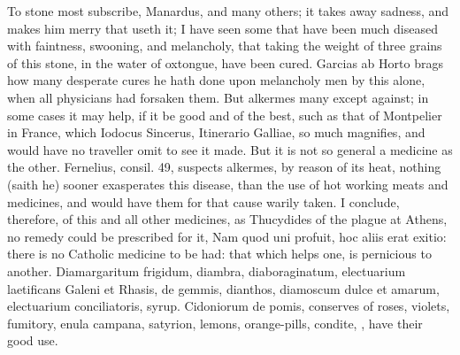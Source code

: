 To  stone most subscribe, Manardus, and many others; it
takes away sadness, and makes him merry that useth it; I have seen some
that have been much diseased with faintness, swooning, and melancholy,
that taking the weight of three grains of this stone, in the water of
oxtongue, have been cured. Garcias ab Horto brags how many desperate
cures he hath done upon melancholy men by this alone, when all
physicians had forsaken them. But alkermes many except against; in some
cases it may help, if it be good and of the best, such as that of
Montpelier in France, which Iodocus Sincerus, Itinerario Galliae,
so much magnifies, and would have no traveller omit to see it made. But
it is not so general a medicine as the other. Fernelius, consil. 49,
suspects alkermes, by reason of its heat, nothing (saith he)
sooner exasperates this disease, than the use of hot working meats and
medicines, and would have them for that cause warily taken. I conclude,
therefore, of this and all other medicines, as Thucydides of the plague
at Athens, no remedy could be prescribed for it, Nam quod uni profuit,
hoc aliis erat exitio: there is no Catholic medicine to be had: that
which helps one, is pernicious to another.
Diamargaritum frigidum, diambra, diaboraginatum, electuarium
laetificans Galeni et Rhasis, de gemmis, dianthos, diamoscum dulce et
amarum, electuarium conciliatoris, syrup. Cidoniorum de pomis,
conserves of roses, violets, fumitory, enula campana, satyrion, lemons,
orange-pills, condite, \etc{}, have their good use.

